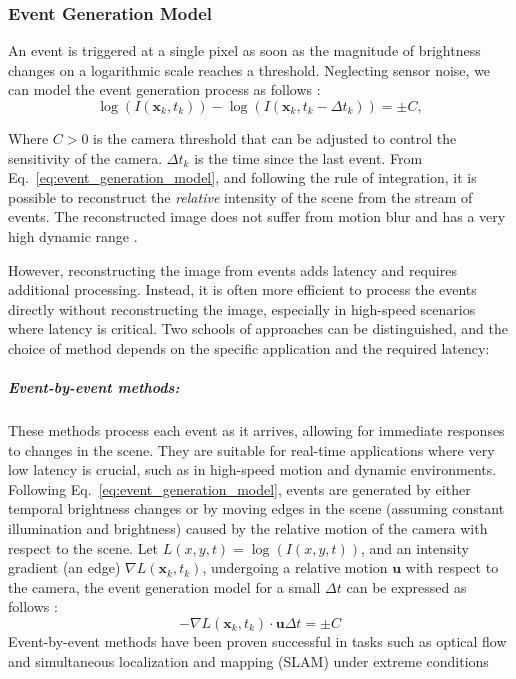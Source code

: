 \documentclass{article}
\begin{document}
\subsubsection{Event Generation Model}
An event is triggered at a single pixel as soon as the magnitude of brightness changes on a logarithmic scale reaches a threshold. Neglecting sensor noise, we can model the event generation process as follows \cite{gallegoEventbasedVisionSurvey2022}:
\begin{equation}
    \log(I(\textbf{x}_k,t_k)) - \log(I(\textbf{x}_k,t_k-\Delta t_k)) = \pm C,
    \label{eq:event_generation_model}
\end{equation}
    
Where $C>0$ is the camera threshold that can be adjusted to control the sensitivity of the camera. $\Delta t_k$ is the time since the last event. From Eq.~\eqref{eq:event_generation_model}, and following the rule of integration, it is possible to reconstruct the \textit{relative} intensity of the scene from the stream of events. The reconstructed image does not suffer from motion blur and has a very high dynamic range \cite{rebecqHighSpeedHigh2019}. 

However, reconstructing the image from events adds latency and requires additional processing. Instead, it is often more efficient to process the events directly without reconstructing the image, especially in high-speed scenarios where latency is critical. Two schools of approaches can be distinguished, and the choice of method depends on the specific application and the required latency:

\subparagraph{Event-by-event methods:} These methods process each event as it arrives, allowing for immediate responses to changes in the scene. They are suitable for real-time applications where very low latency is crucial, such as in high-speed motion and dynamic environments. Following Eq.~\eqref{eq:event_generation_model}, events are generated by either temporal brightness changes or by moving edges in the scene (assuming constant illumination and brightness) caused by the relative motion of the camera with respect to the scene. Let $L(x,y,t)=\log(I(x,y,t))$, and an intensity gradient (an edge) $\nabla L(\textbf{x}_k,t_k)$, undergoing a relative motion $\textbf{u}$ with respect to the camera, the event generation model for a small $\Delta t$ can be expressed as follows \cite{gallegoEventbasedVisionSurvey2022, gallegoEventbasedCameraPose2015}:
\begin{equation}
    -\nabla L(\textbf{x}_k,t_k) \cdot \textbf{u}\Delta t = \pm C
    \label{eq:moving_edges_event}
\end{equation}
Event-by-event methods have been proven successful in tasks such as optical flow and simultaneous localization and mapping (SLAM) under extreme conditions \cite{vidalUltimateSLAMCombining2018, cuadradoOpticalFlowEstimation2023,gehrigERAFTDenseOptical2021, sunAutonomousQuadrotorFlight2021}
\end{document}

